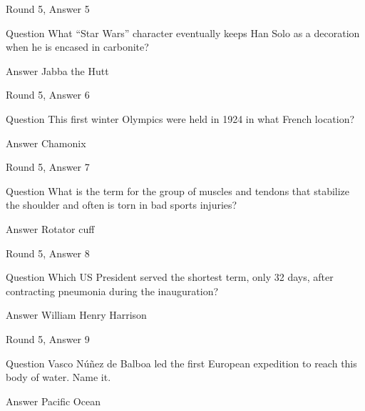 \documentclass[11pt]{beamer}
\begin{document}
\begin{frame}{Round 5, Answer 5}
\begin{block}{Question}
What ``Star Wars'' character eventually keeps Han Solo as a decoration when he is encased in carbonite\@?
\end{block}
\pause{}
\begin{block}{Answer}
Jabba the Hutt
\end{block}
\end{frame}
    

\begin{frame}{Round 5, Answer 6}
\begin{block}{Question}
This first winter Olympics were held in 1924 in what French location\@?
\end{block}
\pause{}
\begin{block}{Answer}
Chamonix
\end{block}
\end{frame}
    

\begin{frame}{Round 5, Answer 7}
\begin{block}{Question}
What is the term for the group of muscles and tendons that stabilize the shoulder and often is torn in bad sports injuries\@?
\end{block}
\pause{}
\begin{block}{Answer}
Rotator cuff
\end{block}
\end{frame}
    

\begin{frame}{Round 5, Answer 8}
\begin{block}{Question}
Which US President served the shortest term, only 32 days, after contracting pneumonia during the inauguration\@?
\end{block}
\pause{}
\begin{block}{Answer}
William Henry Harrison
\end{block}
\end{frame}
    

\begin{frame}{Round 5, Answer 9}
\begin{block}{Question}
Vasco Núñez de Balboa led the first European expedition to reach this body of water. Name it.
\end{block}
\pause{}
\begin{block}{Answer}
Pacific Ocean
\end{block}
\end{frame}
    
\end{document}
